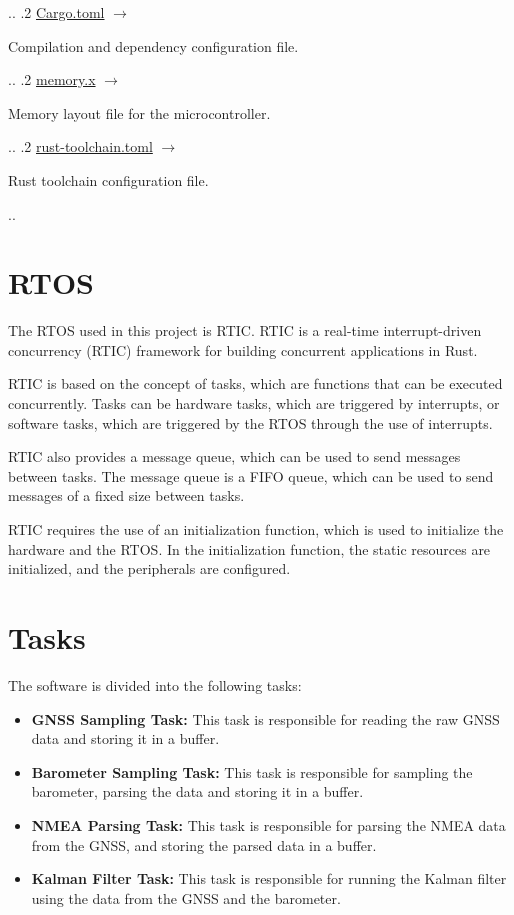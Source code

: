 {\begin{minipage}[t]{7cm}
    \end{minipage}..
    .2 \href{https://github.com/JensMoeslund/gps-miniprojekt/blob/master/Cargo.toml}{Cargo.toml} $\longrightarrow$
    \begin{minipage}[t]{7cm}
        Compilation and dependency configuration file{.}
    \end{minipage}..
    .2 \href{https://github.com/JensMoeslund/gps-miniprojekt/blob/master/memory.x}{memory.x} $\longrightarrow$
    \begin{minipage}[t]{7cm}
        Memory layout file for the microcontroller{.}
    \end{minipage}..
    .2 \href{https://github.com/JensMoeslund/gps-miniprojekt/blob/master/rust-toolchain.toml}{rust-toolchain.toml} $\longrightarrow$
    \begin{minipage}[t]{7cm}
        Rust toolchain configuration file{.}
    \end{minipage}..
}


\section{RTOS}
The RTOS used in this project is RTIC.
RTIC is a real-time interrupt-driven concurrency (RTIC) framework for building concurrent applications in Rust.

RTIC is based on the concept of tasks, which are functions that can be executed concurrently.
Tasks can be hardware tasks, which are triggered by interrupts, or software tasks, which are triggered by the RTOS through the use of interrupts.

RTIC also provides a message queue, which can be used to send messages between tasks.
The message queue is a FIFO queue, which can be used to send messages of a fixed size between tasks.

RTIC requires the use of an initialization function, which is used to initialize the hardware and the RTOS.
In the initialization function, the static resources are initialized, and the peripherals are configured.


\section{Tasks}
The software is divided into the following tasks:
\begin{itemize}
    \item \textbf{GNSS Sampling Task:} This task is responsible for reading the raw GNSS data and storing it in a buffer.
    \item \textbf{Barometer Sampling Task:} This task is responsible for sampling the barometer, parsing the data and storing it in a buffer.
    \item \textbf{NMEA Parsing Task:} This task is responsible for parsing the NMEA data from the GNSS, and storing the parsed data in a buffer.
    \item \textbf{Kalman Filter Task:} This task is responsible for running the Kalman filter using the data from the GNSS and the barometer.
\end{itemize}

